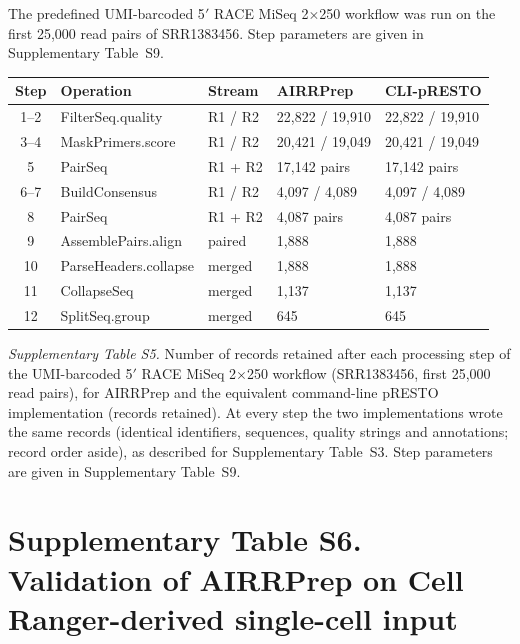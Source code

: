 \documentclass[11pt]{article}
\begin{document}
The predefined UMI-barcoded 5$'$ RACE MiSeq 2$\times$250 workflow was run on
the first 25,000 read pairs of SRR1383456. Step parameters are given in
Supplementary Table~S9.

\begin{table}[htbp]
\centering
\small
\begin{tabular}{cllll}
\toprule
\textbf{Step} & \textbf{Operation} & \textbf{Stream} & \textbf{AIRRPrep} & \textbf{CLI-pRESTO} \\
\midrule

1--2
& FilterSeq.quality
& R1 / R2
& 22,822 / 19,910
& 22,822 / 19,910 \\

3--4
& MaskPrimers.score
& R1 / R2
& 20,421 / 19,049
& 20,421 / 19,049 \\

5
& PairSeq
& R1 + R2
& 17,142 pairs
& 17,142 pairs \\

6--7
& BuildConsensus
& R1 / R2
& 4,097 / 4,089
& 4,097 / 4,089 \\

8
& PairSeq
& R1 + R2
& 4,087 pairs
& 4,087 pairs \\

9
& AssemblePairs.align
& paired
& 1,888
& 1,888 \\

10
& ParseHeaders.collapse
& merged
& 1,888
& 1,888 \\

11
& CollapseSeq
& merged
& 1,137
& 1,137 \\

12
& SplitSeq.group
& merged
& 645
& 645 \\

\bottomrule
\end{tabular}
\end{table}

{\small\textit{Supplementary Table S5.} Number of records retained after each
processing step of the UMI-barcoded 5$'$ RACE MiSeq 2$\times$250 workflow
(SRR1383456, first 25,000 read pairs), for AIRRPrep and the equivalent
command-line pRESTO implementation (records retained). At every step the two
implementations wrote the same records (identical identifiers, sequences,
quality strings and annotations; record order aside), as described for
Supplementary Table~S3. Step parameters are given in Supplementary
Table~S9.\par}

\section*{Supplementary Table S6. Validation of AIRRPrep on Cell Ranger-derived single-cell input}
\end{document}
